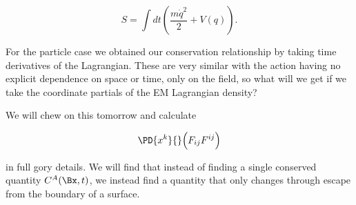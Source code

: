 \begin{equation}\label{eqn:relativisticElectrodynamicsL21b:520}
S = \int dt \left( \frac{m \dot{q}^2}{2} + V(q) \right).
\end{equation}

For the particle case we obtained our conservation relationship by taking time derivatives of the Lagrangian.  These are very similar with the action having no explicit dependence on space or time, only on the field, so what will we get if we take the coordinate partials of the EM Lagrangian density?

We will chew on this tomorrow and calculate 

\begin{equation}\label{eqn:relativisticElectrodynamicsL21b:540}
\PD{x^k}{} \Bigl( F_{i j} F^{i j} \Bigr)
\end{equation}

in full gory details.  We will find that instead of finding a single conserved quantity $C^A(\Bx, t)$, we instead find a quantity that only changes through escape from the boundary of a surface.
